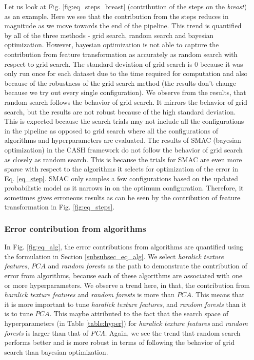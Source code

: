 Let us look at Fig. \ref{fig:eq_steps_breast} (contribution of the steps on the \textit{breast}) as an example. Here we see that the contribution from the steps reduces in magnitude as we move towards the end of the pipeline. This trend is quantified by all of the three methods - grid search, random search and bayesian optimization. However, bayesian optimization is not able to capture the contribution from feature transformation as accurately as random search with respect to grid search.
 The standard deviation of grid search is 0 because it was only run once for each dataset due to the time required for computation and also because of the robustness of the grid search method (the results don't change because we try out every single configuration). We observe from the results, that random search follows the behavior of grid search. It mirrors the behavior of grid search, but the results are not robust because of the high standard deviation. This is expected because the search trials may not include all the configurations in the pipeline as opposed to grid search where all the configurations of algorithms and hyperparameters are evaluated. The results of SMAC (bayesian optimization) in the CASH framework do not follow the behavior of grid search as closely as random search. This is because the trials for SMAC are even more sparse with respect to the algorithms it selects for optimization of  the error in Eq. \ref{eq_step}. SMAC only samples a few configurations based on the updated probabilistic model as it narrows in on the optimum configuration. Therefore, it sometimes gives erroneous results as can be seen by the contribution of feature transformation in Fig. \ref{fig:eq_steps}.


\subsubsection{Error contribution from algorithms}

In Fig. \ref{fig:eq_alg}, the error contributions from algorithms are quantified using the formulation in Section \ref{subsubsec_eq_alg}. We select \textit{haralick texture features}, $PCA$ and \textit{random forests} as the path to demonstrate the contribution of error from algorithms, because each of these algorithms are associated with one or more hyperparameters. We observe a trend here, in that, the contribution from \textit{haralick texture features} and \textit{random forests} is more than $PCA$. This means that it is more important to tune \textit{haralick texture features}, and \textit{random forests} than it is to tune  $PCA$. This maybe attributed to the fact that the search space of hyperparameters (in Table \ref{table:hyper}) for \textit{haralick texture features} and \textit{random forests} is larger than that of \textit{PCA}. Again, we see the trend that random search performs better and is more robust in terms of following the behavior of grid search than bayesian optimization.

